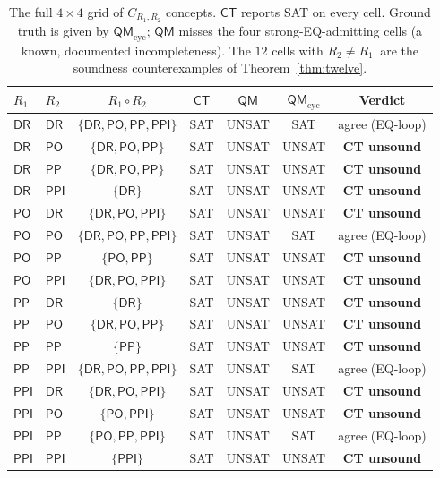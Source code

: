 \documentclass[]{ceurart}
\newcommand{\DR}{\mathsf{DR}}
\newcommand{\PO}{\mathsf{PO}}
\newcommand{\PP}{\mathsf{PP}}
\newcommand{\PPI}{\mathsf{PPI}}
\newcommand{\comp}{\circ}
\newcommand{\inv}[1]{#1^{-}}
\theoremstyle{definition}
\theoremstyle{remark}
\begin{document}
\begin{table}
  \caption{The full $4 \!\times\! 4$ grid of $C_{R_1, R_2}$ concepts.
    $\mathsf{CT}$ reports SAT on every cell.  Ground truth is given by
    $\mathsf{QM}_{\mathrm{cyc}}$; $\mathsf{QM}$ misses the four
    strong-EQ-admitting cells (a known, documented incompleteness).
    The $12$ cells with $R_2 \neq \inv{R_1}$ are the soundness
    counterexamples of Theorem~\ref{thm:twelve}.}
  \label{tab:twelve}
  \centering
  \begin{tabular}{llccccc}
    \toprule
    $R_1$  & $R_2$  & $R_1 \comp R_2$        & $\mathsf{CT}$ & $\mathsf{QM}$ & $\mathsf{QM}_{\mathrm{cyc}}$ & Verdict \\
    \midrule
    $\DR$  & $\DR$  & $\{\DR,\PO,\PP,\PPI\}$ & SAT & UNSAT & SAT & agree (EQ-loop) \\
    $\DR$  & $\PO$  & $\{\DR,\PO,\PP\}$      & SAT & UNSAT & UNSAT & \textbf{CT unsound} \\
    $\DR$  & $\PP$  & $\{\DR,\PO,\PP\}$      & SAT & UNSAT & UNSAT & \textbf{CT unsound} \\
    $\DR$  & $\PPI$ & $\{\DR\}$              & SAT & UNSAT & UNSAT & \textbf{CT unsound} \\
    $\PO$  & $\DR$  & $\{\DR,\PO,\PPI\}$     & SAT & UNSAT & UNSAT & \textbf{CT unsound} \\
    $\PO$  & $\PO$  & $\{\DR,\PO,\PP,\PPI\}$ & SAT & UNSAT & SAT & agree (EQ-loop) \\
    $\PO$  & $\PP$  & $\{\PO,\PP\}$          & SAT & UNSAT & UNSAT & \textbf{CT unsound} \\
    $\PO$  & $\PPI$ & $\{\DR,\PO,\PPI\}$     & SAT & UNSAT & UNSAT & \textbf{CT unsound} \\
    $\PP$  & $\DR$  & $\{\DR\}$              & SAT & UNSAT & UNSAT & \textbf{CT unsound} \\
    $\PP$  & $\PO$  & $\{\DR,\PO,\PP\}$      & SAT & UNSAT & UNSAT & \textbf{CT unsound} \\
    $\PP$  & $\PP$  & $\{\PP\}$              & SAT & UNSAT & UNSAT & \textbf{CT unsound} \\
    $\PP$  & $\PPI$ & $\{\DR,\PO,\PP,\PPI\}$ & SAT & UNSAT & SAT & agree (EQ-loop) \\
    $\PPI$ & $\DR$  & $\{\DR,\PO,\PPI\}$     & SAT & UNSAT & UNSAT & \textbf{CT unsound} \\
    $\PPI$ & $\PO$  & $\{\PO,\PPI\}$         & SAT & UNSAT & UNSAT & \textbf{CT unsound} \\
    $\PPI$ & $\PP$  & $\{\PO,\PP,\PPI\}$     & SAT & UNSAT & SAT & agree (EQ-loop) \\
    $\PPI$ & $\PPI$ & $\{\PPI\}$             & SAT & UNSAT & UNSAT & \textbf{CT unsound} \\
    \bottomrule
  \end{tabular}
\end{table}
\end{document}
